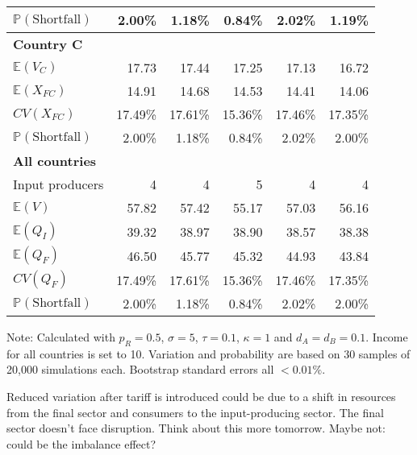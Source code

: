 \documentclass{article}
\begin{document}
\begin{table}
\begin{threeparttable}
\begin{tabular}{lrrrrr}
            $\mathbb{P}(\text{Shortfall})$ & 2.00\% & 1.18\% & 0.84\% & 2.02\% & 1.19\% \\ 
            \midrule
            \textbf{Country C} \\
            $\mathbb{E}(V_C)$ & 17.73 & 17.44 & 17.25 & 17.13 & 16.72 \\
            $\mathbb{E}(X_{FC})$ & 14.91 & 14.68 & 14.53 & 14.41 & 14.06 \\
            $CV(X_{FC})$ & 17.49\% & 17.61\% & 15.36\% & 17.46\% & 17.35\% \\
            $\mathbb{P}(\text{Shortfall})$ & 2.00\% & 1.18\% & 0.84\% & 2.02\% & 2.00\% \\ 
            \midrule
            \textbf{All countries} \\
            Input producers & 4 & 4 & 5 & 4 & 4 \\
            $\mathbb{E}(V)$ & 57.82 & 57.42 & 55.17 & 57.03 & 56.16 \\
            $\mathbb{E}(Q_I)$ & 39.32 & 38.97 & 38.90 & 38.57 & 38.38 \\
            $\mathbb{E}(Q_F)$ & 46.50 & 45.77 & 45.32 & 44.93 & 43.84 \\
            $CV(Q_F)$ & 17.49\% & 17.61\% & 15.36\% & 17.46\% & 17.35\% \\
            $\mathbb{P}(\text{Shortfall})$ & 2.00\% &1.18\% & 0.84\% & 2.02\% & 2.00\% \\ 
            \bottomrule
        \end{tabular}
        \begin{tablenotes}
            \small \item Note: Calculated with $p_R = 0.5$, $\sigma = 5$, $\tau = 0.1$, $\kappa = 1$ and $d_A = d_B = 0.1$. Income for all countries is set to 10. Variation and probability are based on 30 samples of 20,000 simulations each. Bootstrap standard errors all $<0.01\%$.
        \end{tablenotes}
    \end{threeparttable}
\end{table}

Reduced variation after tariff is introduced could be due to a shift in resources from the final sector and consumers to the input-producing sector. The final sector doesn't face disruption. Think about this more tomorrow. Maybe not: could be the imbalance effect?
\end{document}
